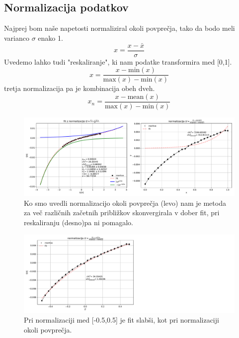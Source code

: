 \documentclass[11pt, a4paper]{article}
\begin{document}
\subsection{Normalizacija podatkov}
Najprej bom naše napetosti normaliziral okoli povprečja, tako da bodo meli varianco $\sigma$ enako 1.
\begin{equation}
x = \frac{x - \bar{x}}{\sigma}
\end{equation}
Uvedemo lahko tudi "reskaliranje", ki nam podatke transformira med [0,1].
\begin{equation}
 x={\frac {x-{\text{min}}(x)}{{\text{max}}(x)-{\text{min}}(x)}}
\end{equation}
tretja normalizacija pa je kombinacija obeh dveh.
\begin{equation}
 x_n={\frac {x-{\text{mean}}(x)}{{\text{max}}(x)-{\text{min}}(x)}}
\end{equation}
\begin{figure}[H]
\hspace*{-2.5cm}     
  \includegraphics[width=20.cm] {tretja_normalizacija.pdf}
 \caption{Ko smo uvedli normalizacijo okoli povprečja (levo) nam je metoda za več različnih začetnih približkov skonvergirala v dober fit, pri reskaliranju (desno)pa ni pomagalo. }
\end{figure}
\begin{figure}[H]
\hspace*{-2.5cm}     
  \includegraphics[width=20.cm] {tretja_normalizacijski_fit2.pdf}
 \caption{Pri normalizaciji med [-0.5,0.5] je  fit slabši, kot pri normalizaciji okoli povprečja.}
 \end{figure}
\end{document}
